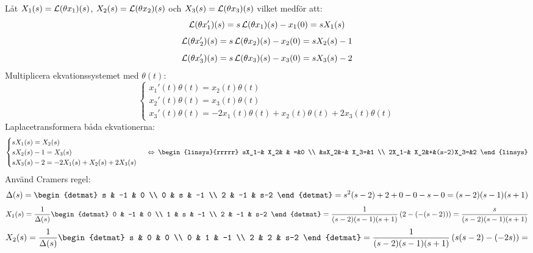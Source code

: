 \pagebreak
\begin{task}{5.17}
	Låt $X_1(s)=\operatorname{\mathcal{L}}(\theta x_1)(s)$, $X_2(s)=\operatorname{\mathcal{L}}(\theta x_2)(s)$ och $X_3(s)=\operatorname{\mathcal{L}}(\theta x_3)(s)$ vilket medför att:
	\[\operatorname{\mathcal{L}}(\theta x_1')(s)=s\operatorname{\mathcal{L}}(\theta x_1)(s)-x_1(0)=sX_1(s)\]
	\[\operatorname{\mathcal{L}}(\theta x_2')(s)=s\operatorname{\mathcal{L}}(\theta x_2)(s)-x_2(0)=sX_2(s)-1\]
	\[\operatorname{\mathcal{L}}(\theta x_3')(s)=s\operatorname{\mathcal{L}}(\theta x_3)(s)-x_3(0)=sX_3(s)-2\]
	Multiplicera ekvationssystemet med $\theta(t)$:
	\[
	\begin{cases}
	x_1'(t)\theta(t)=x_2(t)\theta(t) \\
	x_2'(t)\theta(t)=x_3(t)\theta(t) \\
	x_3'(t)\theta(t)=-2x_1(t)\theta(t)+x_2(t)\theta(t)+2x_3(t)\theta(t)
	\end{cases}\]
	Laplacetransformera båda ekvationerna:
	\[
	\begin{cases}
	sX_1(s)=X_2(s) \\
	sX_2(s)-1=X_3(s) \\
	sX_3(s)-2=-2X_1(s)+X_2(s)+2X_3(s)
	\end{cases} \lra
	\begin{linsys}{rrrrr}
	sX_1-& X_2& &        =&0 \\
	     &sX_2&-&     X_3=&1 \\
	2X_1-& X_2&+&(s-2)X_3=&2
	\end{linsys}\]
	Använd Cramers regel:
	\begin{align*}
	\Delta(s)=\begin{detmat}
	s & -1 & 0 \\
	0 & s & -1 \\
	2 & -1 & s-2
	\end{detmat}=
	s^2(s-2)+2+0-0-s-0=
	(s-2)(s-1)(s+1)
	\end{align*}
	\begin{align*}
	X_1(s)=
	\frac{1}{\Delta(s)}\begin{detmat}
	0 & -1 & 0 \\
	1 & s & -1 \\
	2 & -1 & s-2
	\end{detmat}=
	\frac{1}{(s-2)(s-1)(s+1)}\left(2-(-(s-2))\right)=
	\frac{s}{(s-2)(s-1)(s+1)}
	\end{align*}
	\begin{align*}
	X_2(s)=
	\frac{1}{\Delta(s)}\begin{detmat}
	s & 0 & 0 \\
	0 & 1 & -1 \\
	2 & 2 & s-2
	\end{detmat}=
	\frac{1}{(s-2)(s-1)(s+1)}\left(s(s-2)-(-2s)\right)=

\end{align*}
\end{task}
